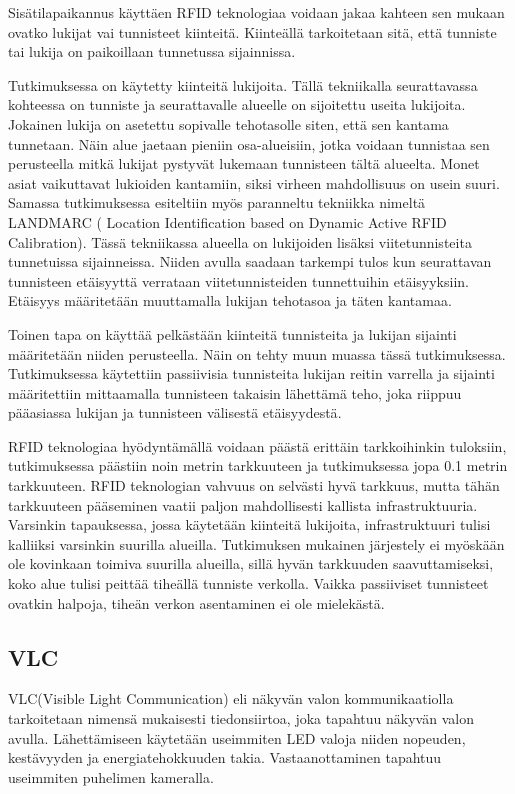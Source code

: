 Sisätilapaikannus käyttäen RFID teknologiaa voidaan jakaa kahteen sen mukaan ovatko lukijat vai tunnisteet kiinteitä. Kiinteällä tarkoitetaan sitä, että tunniste tai lukija on paikoillaan tunnetussa sijainnissa. 

Tutkimuksessa \cite{E} on käytetty kiinteitä lukijoita. Tällä tekniikalla seurattavassa kohteessa on tunniste ja seurattavalle alueelle on sijoitettu useita lukijoita. Jokainen lukija on asetettu sopivalle tehotasolle siten, että sen kantama tunnetaan. Näin alue jaetaan pieniin osa-alueisiin, jotka voidaan tunnistaa sen perusteella mitkä lukijat pystyvät lukemaan tunnisteen tältä alueelta. Monet asiat vaikuttavat lukioiden kantamiin, siksi virheen mahdollisuus on usein suuri.
Samassa tutkimuksessa\cite{E} esiteltiin myös paranneltu tekniikka nimeltä LANDMARC ( Location Identification based on Dynamic Active RFID Calibration). Tässä tekniikassa alueella on lukijoiden lisäksi viitetunnisteita tunnetuissa sijainneissa. Niiden avulla saadaan tarkempi tulos kun seurattavan tunnisteen etäisyyttä verrataan viitetunnisteiden tunnettuihin etäisyyksiin. Etäisyys määritetään muuttamalla lukijan tehotasoa ja täten kantamaa.

Toinen tapa on käyttää pelkästään kiinteitä tunnisteita ja lukijan sijainti määritetään niiden perusteella. Näin on tehty muun muassa tässä tutkimuksessa\cite{F}. Tutkimuksessa käytettiin passiivisia tunnisteita lukijan reitin varrella ja sijainti määritettiin mittaamalla tunnisteen takaisin lähettämä teho, joka riippuu pääasiassa lukijan ja tunnisteen välisestä etäisyydestä\cite{F}.

RFID teknologiaa hyödyntämällä voidaan päästä erittäin tarkkoihinkin tuloksiin, tutkimuksessa \cite{E} päästiin noin metrin tarkkuuteen ja tutkimuksessa \cite{F} jopa 0.1 metrin tarkkuuteen. RFID teknologian vahvuus on selvästi hyvä tarkkuus, mutta tähän tarkkuuteen pääseminen vaatii paljon mahdollisesti kallista infrastruktuuria. Varsinkin tapauksessa\cite{E}, jossa käytetään kiinteitä lukijoita, infrastruktuuri tulisi kalliiksi varsinkin suurilla alueilla. Tutkimuksen\cite{F} mukainen järjestely ei myöskään ole kovinkaan toimiva suurilla alueilla, sillä hyvän tarkkuuden saavuttamiseksi, koko alue tulisi peittää tiheällä tunniste verkolla. Vaikka passiiviset tunnisteet ovatkin halpoja\cite{F}, tiheän verkon asentaminen ei ole mielekästä.

\subsection{VLC}
VLC(Visible Light Communication) eli näkyvän valon kommunikaatiolla tarkoitetaan nimensä mukaisesti tiedonsiirtoa, joka tapahtuu näkyvän valon avulla\cite{VLCA}. Lähettämiseen käytetään useimmiten LED valoja niiden nopeuden, kestävyyden ja energiatehokkuuden takia. Vastaanottaminen tapahtuu useimmiten puhelimen kameralla.

